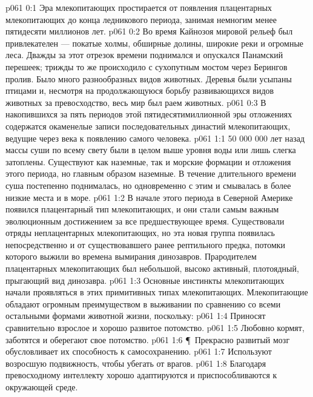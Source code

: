 \vs p061 0:1 Эра млекопитающих простирается от появления плацентарных млекопитающих до конца ледникового периода, занимая немногим менее пятидесяти миллионов лет.
\vs p061 0:2 Во время Кайнозоя мировой рельеф был привлекателен --- покатые холмы, обширные долины, широкие реки и огромные леса. Дважды за этот отрезок времени поднимался и опускался Панамский перешеек; трижды то же происходило с сухопутным мостом через Берингов пролив. Было много разнообразных видов животных. Деревья были усыпаны птицами и, несмотря на продолжающуюся борьбу развивающихся видов животных за превосходство, весь мир был раем животных.
\vs p061 0:3 В накопившихся за пять периодов этой пятидесятимиллионной эры отложениях содержатся окаменелые записи последовательных династий млекопитающих, ведущие через века к появлению самого человека.
\vs p061 1:1 50 000 000 лет назад массы суши по всему свету были в целом выше уровня воды или лишь слегка затоплены. Существуют как наземные, так и морские формации и отложения этого периода, но главным образом наземные. В течение длительного времени суша постепенно поднималась, но одновременно с этим и смывалась в более низкие места и в море.
\vs p061 1:2 В начале этого периода в Северной Америке  появился плацентарный тип млекопитающих, и они стали самым важным эволюционным достижением за все предшествующее время. Существовали отряды неплацентарных млекопитающих, но эта новая группа появилась непосредственно и  от существовавшего ранее рептильного предка, потомки которого выжили во времена вымирания динозавров. Прародителем плацентарных млекопитающих был небольшой, высоко активный, плотоядный, прыгающий вид динозавра.
\vs p061 1:3 Основные инстинкты млекопитающих начали проявляться в этих примитивных типах млекопитающих. Млекопитающие обладают огромным преимуществом в выживании по сравнению со всеми остальными формами животной жизни, поскольку:
\vs p061 1:4 \bibnobreakspace Приносят сравнительно взрослое и хорошо развитое потомство.
\vs p061 1:5 \bibnobreakspace Любовно кормят, заботятся и оберегают свое потомство.
\vs p061 1:6 \P\ \bibnobreakspace Прекрасно развитый мозг обусловливает их способность к самосохранению.
\vs p061 1:7 \bibnobreakspace Используют возросшую подвижность, чтобы убегать от врагов.
\vs p061 1:8 \bibnobreakspace Благодаря превосходному интеллекту хорошо адаптируются и приспособливаются к окружающей среде.
